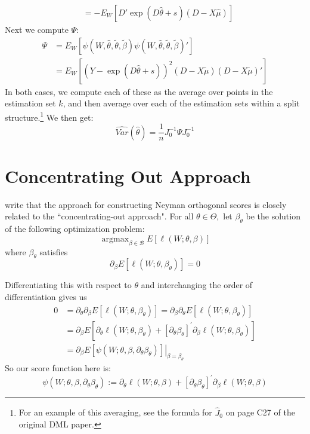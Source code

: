 \documentclass[11pt]{article}
\DeclareMathOperator*{\argmax}{argmax}
\begin{document}
\begin{enumerate}
\begin{align*}
		&= -E_W\left[D'\exp(D\hat{\theta} + s)(D - X\hat{\mu}) \right]
	\end{align*}
	Next we compute $\Psi$:
	\begin{align*}
		\Psi &= E_W\left[\psi(W, \hat{\theta},\tilde{\theta}, \tilde{\beta})\psi(W, \hat{\theta},\tilde{\theta}, \tilde{\beta})'\right] \\
			&= E_W\left[(Y - \exp(D\hat{\theta} + s))^2(D - X\tilde{\mu})(D - X\tilde{\mu})'\right]
	\end{align*}
	In both cases, we compute each of these as the average over points in the estimation set $k$, and then average over each of the estimation sets within a split structure.\footnote{For an example of this averaging, see the formula for $\hat{J}_0$ on page C27 of the original DML paper.} We then get:
	$$\hat{Var}(\hat{\theta}) = \frac{1}{n} J_0^{-1} \Psi J_0^{-1}$$

\end{enumerate}


\section{Concentrating Out Approach}
\citet{chernozhukov_doubledebiased_2018} write that the approach for constructing Neyman orthogonal scores is closely related to the ``concentrating-out approach". For all $\theta \in \Theta,$ let $\beta_{\theta}$ be the solution of the following optimization problem:
$$
\argmax_{\beta \in \mathcal{B}} E[\ell(W ; \theta, \beta)]
$$
where $\beta_\theta$ satisfies
$$\partial_{\beta} E\left[\ell\left(W ; \theta, \beta_{\theta}\right)\right]=0$$

Differentiating this with respect to $\theta$ and interchanging the order of differentiation gives us
$$\begin{aligned}
0 &=\partial_{\theta} \partial_{\beta} E\left[\ell\left(W ; \theta, \beta_{\theta}\right)\right]=\partial_{\beta} \partial_{\theta} E\left[\ell\left(W ; \theta, \beta_{\theta}\right)\right] \\
&=\partial_{\beta} E\left[\partial_{\theta} \ell\left(W ; \theta, \beta_{\theta}\right)+\left[\partial_{\theta} \beta_{\theta}\right]^{\prime} \partial_{\beta} \ell\left(W ; \theta, \beta_{\theta}\right)\right] \\
&=\left.\partial_{\beta} E\left[\psi\left(W ; \theta, \beta, \partial_{\theta} \beta_{\theta}\right)\right]\right|_{\beta=\beta_{\theta}}
\end{aligned}$$
So our score function here is:
$$\psi\left(W ; \theta, \beta, \partial_{\theta} \beta_{\theta}\right):=\partial_{\theta} \ell(W ; \theta, \beta)+\left[\partial_{\theta} \beta_{\theta}\right]^{\prime} \partial_{\beta} \ell(W ; \theta, \beta)$$
\end{document}
